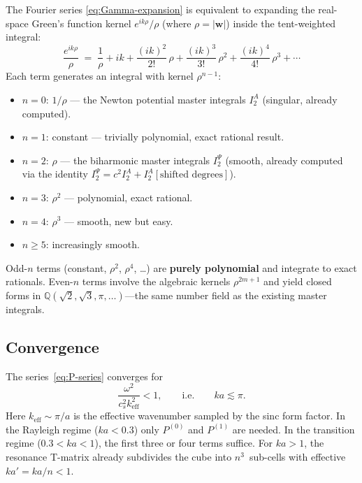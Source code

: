\documentclass[11pt,a4paper]{article}
\newcommand{\bw}{\bm{w}}
\theoremstyle{plain}
\theoremstyle{remark}
\begin{document}
The Fourier series \eqref{eq:Gamma-expansion} is equivalent to
expanding the real-space Green's function kernel $e^{ik\rho}/\rho$
(where $\rho = |\bw|$) inside the tent-weighted integral:
\begin{equation}
  \frac{e^{ik\rho}}{\rho}
  \;=\;
  \frac{1}{\rho}
  + ik
  + \frac{(ik)^2}{2!}\,\rho
  + \frac{(ik)^3}{3!}\,\rho^2
  + \frac{(ik)^4}{4!}\,\rho^3
  + \cdots
  \label{eq:exp-expansion}
\end{equation}
Each term generates an integral with kernel $\rho^{n-1}$:
\begin{itemize}[nosep]
  \item $n=0$: $1/\rho$ --- the Newton potential master integrals
    $I^A_2$ (singular, already computed).
  \item $n=1$: constant --- trivially polynomial, exact rational result.
  \item $n=2$: $\rho$ --- the biharmonic master integrals
    $I^\Psi_2$ (smooth, already computed via the identity
    $I^\Psi_2 = c^2 I^A_2 + I^A_2[\text{shifted degrees}]$).
  \item $n=3$: $\rho^2$ --- polynomial, exact rational.
  \item $n=4$: $\rho^3$ --- smooth, new but easy.
  \item $n \geq 5$: increasingly smooth.
\end{itemize}
Odd-$n$ terms (constant, $\rho^2$, $\rho^4$, \ldots) are
\textbf{purely polynomial} and integrate to exact rationals.  Even-$n$
terms involve the algebraic kernels $\rho^{2m+1}$ and yield closed
forms in $\mathbb{Q}(\sqrt{2},\sqrt{3},\pi,\ldots)$---the same
number field as the existing master integrals.

\subsection{Convergence}

The series~\eqref{eq:P-series} converges for
\begin{equation}
  \frac{\omega^2}{c_s^2 k_{\mathrm{eff}}^2} < 1,
  \qquad\text{i.e.}\qquad
  ka \lesssim \pi.
\end{equation}
Here $k_{\mathrm{eff}} \sim \pi/a$ is the effective wavenumber sampled
by the sinc form factor.  In the Rayleigh regime ($ka < 0.3$) only
$P^{(0)}$ and $P^{(1)}$ are needed.  In the transition regime
($0.3 < ka < 1$), the first three or four terms suffice.
For $ka > 1$, the resonance T-matrix already subdivides the cube into
$n^3$~sub-cells with effective $ka' = ka/n < 1$.
\end{document}
